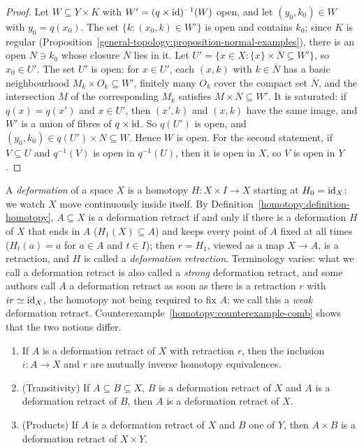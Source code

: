 \begin{proof}
Let $W \subseteq Y \times K$ with $W' = (q \times \mathrm{id})^{-1}(W)$ open, and let $(y_0, k_0) \in W$ with $y_0 = q(x_0)$. The set
$\{k : (x_0, k) \in W'\}$ is open and contains $k_0$; since $K$ is regular (Proposition~\ref{general-topology:proposition-normal-examples}), there is an open
$N \ni k_0$ whose closure $\overline{N}$ lies in it. Let $U' = \{x \in X : \{x\} \times \overline{N} \subseteq W'\}$, so $x_0 \in U'$. The set $U'$ is open: for
$x \in U'$, each $(x, k)$ with $k \in \overline{N}$ has a basic neighbourhood $M_k \times O_k \subseteq W'$, finitely many $O_k$ cover the compact set
$\overline{N}$, and the intersection $M$ of the corresponding $M_k$ satisfies $M \times \overline{N} \subseteq W'$. It is saturated: if $q(x) = q(x')$ and
$x \in U'$, then $(x', k)$ and $(x, k)$ have the same image, and $W'$ is a union of fibres of $q \times \mathrm{id}$. So $q(U')$ is open, and
$(y_0, k_0) \in q(U') \times N \subseteq W$. Hence $W$ is open. For the second statement, if $V \subseteq U$ and $q^{-1}(V)$ is open in $q^{-1}(U)$, then it is
open in $X$, so $V$ is open in $Y$.
\end{proof}

\begin{remark}\label{homotopy:remark-deformations}
A \emph{deformation} of a space $X$ is a homotopy $H \colon X \times I \to X$ starting at $H_0 = \mathrm{id}_X$: we watch $X$ move continuously inside itself.
By Definition~\ref{homotopy:definition-homotopy}, $A \subseteq X$ is a deformation retract if and only if there is a deformation $H$ of $X$ that ends in
$A$ ($H_1(X) \subseteq A$) and keeps every point of $A$ fixed at all times ($H_t(a) = a$ for $a \in A$ and $t \in I$); then $r = H_1$, viewed as a map
$X \to A$, is a retraction, and $H$ is called a \emph{deformation retraction}. Terminology varies: what we call a deformation retract is also called a
\emph{strong} deformation retract, and some authors call $A$ a deformation retract as soon as there is a retraction $r$ with $ir \simeq \mathrm{id}_X$, the homotopy
not being required to fix $A$; we call this a \emph{weak} deformation retract. Counterexample~\ref{homotopy:counterexample-comb} shows that the two notions
differ.
\end{remark}

\begin{lemma}\label{homotopy:lemma-deformation-retract}
\begin{enumerate}
\item If $A$ is a deformation retract of $X$ with retraction $r$, then the inclusion $i \colon A \to X$ and $r$ are mutually inverse homotopy equivalences.
\item (Transitivity) If $A \subseteq B \subseteq X$, $B$ is a deformation retract of $X$ and $A$ is a deformation retract of $B$, then $A$ is a deformation
retract of $X$.
\item (Products) If $A$ is a deformation retract of $X$ and $B$ one of $Y$, then $A \times B$ is a deformation retract of $X \times Y$.
\end{enumerate}
\end{lemma}

